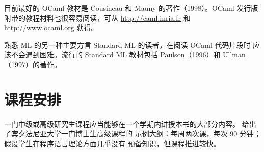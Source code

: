 
目前最好的 OCaml 教材是 Cousineau 和 Mauny 的著作（1998）。OCaml
发行版附带的教程材料也很容易阅读，可从
\url{http://caml.inria.fr} 和 \url{http://www.ocaml.org} 获得。

熟悉 ML 的另一种主要方言 Standard ML 的读者，在阅读 OCaml 代码片段时
应该不会遇到困难。流行的 Standard ML 教材包括 Paulson（1996）和
Ullman（1997）的著作。

\section*{课程安排}

一门中级或高级研究生课程应当能够在一个学期内讲授本书的大部分内容。
给出了宾夕法尼亚大学一门博士生高级课程的
示例大纲：每周两次课，每次 90 分钟；假设学生在程序语言理论方面几乎没有
预备知识，但课程推进较快。

